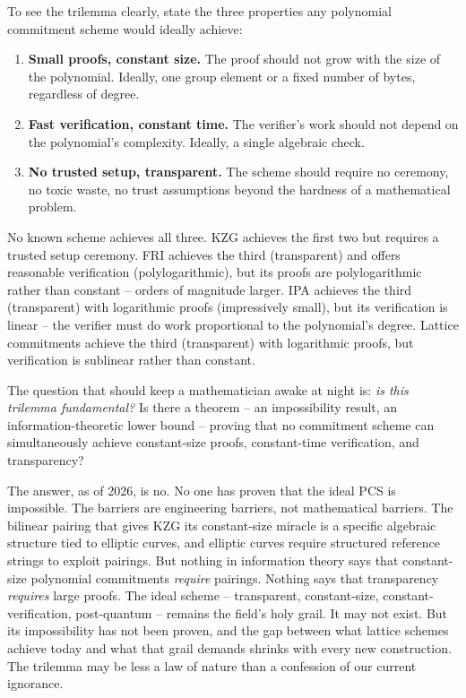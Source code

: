 \documentclass[
  11pt,
  openany]{report}
\providecommand{\tightlist}{%
  \setlength{\itemsep}{0pt}\setlength{\parskip}{0pt}}
\renewcommand{\textbf}[1]{{\bfseries\color{MidnightBold}#1}}
\begin{document}
To see the trilemma clearly, state the three properties any polynomial
commitment scheme would ideally achieve:

\begin{enumerate}
\def\labelenumi{\arabic{enumi}.}
\tightlist
\item
  \textbf{Small proofs, constant size.} The proof should not grow with the size
  of the polynomial. Ideally, one group element or a fixed number of bytes,
  regardless of degree.
\item
  \textbf{Fast verification, constant time.} The verifier's work should not
  depend on the polynomial's complexity. Ideally, a single algebraic check.
\item
  \textbf{No trusted setup, transparent.} The scheme should require no ceremony,
  no toxic waste, no trust assumptions beyond the hardness of a mathematical
  problem.
\end{enumerate}

No known scheme achieves all three. KZG achieves the first two but requires a
trusted setup ceremony. FRI achieves the third (transparent) and offers
reasonable verification (polylogarithmic), but its proofs are polylogarithmic
rather than constant -- orders of magnitude larger. IPA achieves the third
(transparent) with logarithmic proofs (impressively small), but its verification
is linear -- the verifier must do work proportional to the polynomial's degree.
Lattice commitments achieve the third (transparent) with logarithmic proofs, but
verification is sublinear rather than constant.

The question that should keep a mathematician awake at night is: \emph{is this
trilemma fundamental?} Is there a theorem -- an impossibility result, an
information-theoretic lower bound -- proving that no commitment scheme can
simultaneously achieve constant-size proofs, constant-time verification, and
transparency?

The answer, as of 2026, is no. No one has proven that the ideal PCS is
impossible. The barriers are engineering barriers, not mathematical barriers.
The bilinear pairing that gives KZG its constant-size miracle is a specific
algebraic structure tied to elliptic curves, and elliptic curves require
structured reference strings to exploit pairings. But nothing in information
theory says that constant-size polynomial commitments \emph{require} pairings.
Nothing says that transparency \emph{requires} large proofs. The ideal scheme --
transparent, constant-size, constant-verification, post-quantum -- remains the
field's holy grail. It may not exist. But its impossibility has not been proven,
and the gap between what lattice schemes achieve today and what that grail
demands shrinks with every new construction. The trilemma may be less a law of
nature than a confession of our current ignorance.
\end{document}
